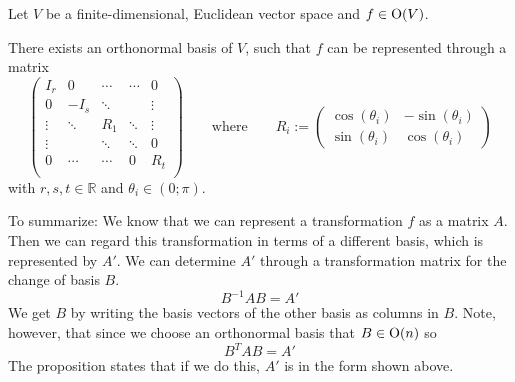 \begin{proposition}\label{pro:orth_group}
   Let \(V\) be a finite-dimensional, Euclidean vector space and \(f \in \operatorname{O}(V)\).

   There exists an orthonormal basis of \(V\), such that \(f\) can be represented through a matrix
   \[
      \begin{pmatrix}
         I_r    & 0      & \cdots & \cdots & 0\\
         0      & -I_s   & \ddots &        & \vdots \\
         \vdots & \ddots & R_1    & \ddots & \vdots \\
         \vdots &        & \ddots & \ddots & 0\\
         0      & \cdots & \cdots & 0      & R_t\\
      \end{pmatrix} \qquad\text{where}\qquad R_i := \begin{pmatrix}
         \cos(\theta_i) & -\sin(\theta_i)\\
         \sin(\theta_i) & \cos(\theta_i)
      \end{pmatrix}
   \]
   with \(r, s, t \in \mathbb{R}\) and \(\theta_i \in (0; \pi)\).
\end{proposition}
\begin{remark}
   To summarize: We know that we can represent a transformation \(f\) as a matrix \(A\).
   Then we can regard this transformation in terms of a different basis, which is represented by \(A'\).
   We can determine \(A'\) through a transformation matrix for the change of basis \(B\).
   \[B^{-1}AB = A'\]
   We get \(B\) by writing the basis vectors of the other basis as columns in \(B\).
   Note, however, that since we choose an orthonormal basis that \(B \in \operatorname{O}(n)\) so
   \[B^TAB = A'\]
   The proposition states that if we do this, \(A'\) is in the form shown above.
\end{remark}
